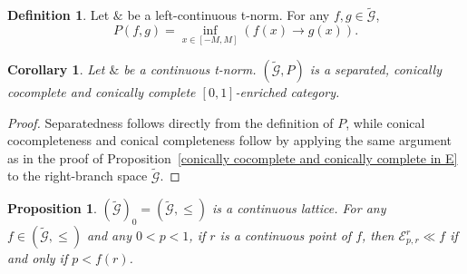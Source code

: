 \documentclass[preprint,3p,times]{elsarticle}
\theoremstyle{plain}
\newtheorem{prop}[thm]{Proposition}
\newtheorem{cor}[thm]{Corollary}
\theoremstyle{definition}
\newtheorem{definition}[thm]{Definition}
\numberwithin{equation}{section}
\begin{document}
\begin{definition}
	Let  \(\&\) be a  left-continuous t-norm. For any \(f,g\in \tilde{\mathcal{G} }\),
	\[P(f,g)=\inf_{x\in [-M,M]} \left(f(x)\rightarrow g(x)\right).\]
\end{definition}
\begin{cor}
	Let  \(\&\) be a continuous t-norm. \((\tilde{\mathcal{G} },P)\) is a separated, conically cocomplete  and  conically complete \([0,1]\)-enriched category.
\end{cor}
\begin{proof}
Separatedness follows directly from the definition of \(P\), while conical cocompleteness and conical completeness follow by applying the same argument as in the proof of Proposition~\ref{conically cocomplete and conically complete in E} to the right-branch space \(\widetilde{\mathcal G}\).
\end{proof}
\begin{prop}\label{way-below of crisp order}
\((\tilde{\mathcal{G}})_0=(\tilde{\mathcal{G}},\le)\) is a continuous lattice. For any \(f\in(\tilde{\mathcal{G}},\le)\) and any \(0<p<1\), if \(r\) is a continuous point of \(f\), then \(\mathcal{E}^r_{p,r}\ll f\) if and only if \(p<f(r)\).
\end{prop}
\end{document}
